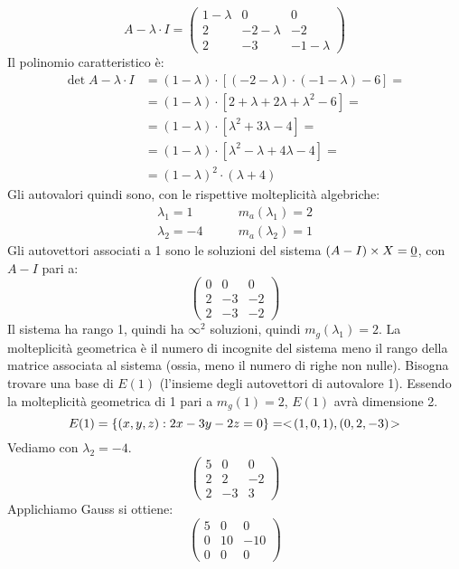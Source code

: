 \begin{exmp}
\[
A - \lambda \cdot I =
\begin{pmatrix}
1-\lambda & 0 & 0 \\
2 & -2-\lambda & -2 \\
2 & -3 & -1-\lambda
\end{pmatrix}
\]
Il polinomio caratteristico \`e:
\begin{align*}
\det{A - \lambda \cdot I} &=
(1 - \lambda) \cdot \left[ (-2 -\lambda) \cdot (-1 - \lambda) - 6 \right] = \\
&= (1 - \lambda) \cdot \left[ 2 + \lambda + 2 \lambda + \lambda^2 - 6 \right] = \\
&= (1 - \lambda) \cdot \left[ \lambda^2 + 3 \lambda - 4 \right] = \\
&= (1 - \lambda) \cdot \left[ \lambda^2 - \lambda + 4 \lambda - 4 \right] = \\
&= (1 - \lambda)^2 \cdot (\lambda + 4)
\end{align*}
Gli autovalori quindi sono, con le rispettive molteplicit\`a algebriche:
\begin{align*}
\lambda_1 = 1 &\qquad m_a(\lambda_1) = 2 \\
\lambda_2 = -4 &\qquad m_a(\lambda_2) = 1
\end{align*}
Gli autovettori associati a 1 sono le soluzioni del sistema $(A - I) \times X = \underline{0}$, con $A - I$ pari a:
\[
\begin{pmatrix}
0 & 0 & 0 \\
2 & -3 & -2 \\
2 & -3 & -2
\end{pmatrix}
\]
Il sistema ha rango 1, quindi ha $\infty^2$ soluzioni, quindi $m_g (\lambda_1) = 2$. La molteplicit\`a geometrica \`e il numero di incognite del sistema meno il rango della matrice associata al sistema (ossia, meno il numero di righe non nulle). Bisogna trovare una base di $E(1)$ (l'insieme degli autovettori di autovalore 1). Essendo la molteplicit\`a geometrica di 1 pari a $m_g (1) = 2$, $E(1)$ avr\`a dimensione 2.
\[
E(1) = \{ (x,y,z) : 2x - 3y -2z = 0\} = <\!{(1,0,1), (0, 2, -3)}\!>
\]
Vediamo con $\lambda_2 = -4$.
\[
\begin{pmatrix}
5 & 0 & 0 \\
2 & 2 & -2 \\
2 & -3 & 3
\end{pmatrix}
\]
Applichiamo Gauss si ottiene:
\[
\begin{pmatrix}
5 & 0 & 0 \\
0 & 10 & -10 \\
0 & 0 & 0
\end{pmatrix}
\]
\end{exmp}
